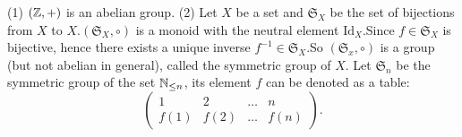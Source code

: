 \begin{exampleenv}
    \quad
    \newline
    (1) $(\mathbb{Z}, +)$ is an abelian group.
    \newline
    (2) Let $X$ be a set and $\mathfrak{S}_X$ be the set of bijections from $X$ to $X$.$(\mathfrak{S}_X , \circ)$ is a monoid with the neutral element $\mathrm{Id}_X$.Since $f\in \mathfrak{S}_X $ is bijective,  hence there exists a unique inverse $f^{-1}\in \mathfrak{S} _X$.So $(\mathfrak{S} _x, \circ)$ is a group (but not abelian in general), called the symmetric group of $X$.
    \newline
    Let $\mathfrak{S} _n$ be the symmetric group of the set $\mathbb{N}_{\le n}$,  its element $f$ can be denoted as a table:
    $$\begin{pmatrix}
  1&2  &\dots &n \\
  f(1)& f(2) &\dots   &f(n)
\end{pmatrix}.$$
\end{exampleenv}
